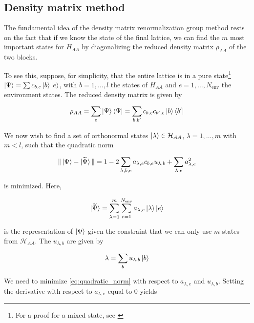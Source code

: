 \subsection{Density matrix method}

The fundamental idea of the density matrix renormalization group method
rests on the fact that if we know the state of the final lattice, we can find the $m$
most important states for $H_{AA}$ by diagonalizing the reduced density
matrix $\rho_{AA}$ of the two blocks.

To see this, suppose, for simplicity, that the entire lattice is in a pure
state\footnote{For a proof for a mixed state, see \cite{noack1999workshop}} $\ket{\Psi} = \sum c_{b, e} \ket{b} \ket{e}$, with $b = 1, \ldots, l$ the
states of $H_{AA}$ and $e = 1, \ldots, N_{\text{env}}$ the environment states. The
reduced density matrix is given by

\begin{equation}\label{eq:density_matrix_superblock}
  \rho_{AA} = \sum_{e} \ket{\Psi} \bra{\Psi} = \sum_{b, b'} c_{b, e} c_{b', e} \ket{b} \bra{b'}
\end{equation}

We now wish to find a set of orthonormal states $\ket{\lambda} \in \mathcal{H}_{AA}$,
$\lambda = 1, \ldots, m$ with $m < l$, such that the quadratic norm

\begin{equation}\label{eq:quadratic_norm}
  \Vert \ket{\Psi} - \ket{\widetilde{\Psi}} \Vert = 1 - 2 \sum_{\lambda, b, e} a_{\lambda, e} c_{b, e} u_{\lambda, b} + \sum_{\lambda, e} a_{\lambda, e}^2
\end{equation}

is minimized. Here,

\begin{equation}
  \ket{\widetilde{\Psi}} = \sum_{\lambda = 1}^{m} \sum_{e = 1}^{N_{\text{env}}} a_{\lambda, e} \ket{\lambda} \ket{e}
\end{equation}

is the representation of $\ket{\Psi}$ given the constraint that we can only use
$m$ states from $\mathcal{H}_{AA}$. The $u_{\lambda, b}$ are given by

\begin{equation}
  \lambda = \sum_{b} u_{\lambda, b} \ket{b}
\end{equation}

We need to minimize \eqref{eq:quadratic_norm} with respect to $a_{\lambda, e}$
and $u_{\lambda, b}$. Setting the derivative with respect to $a_{\lambda, e}$ equal to 0 yields


